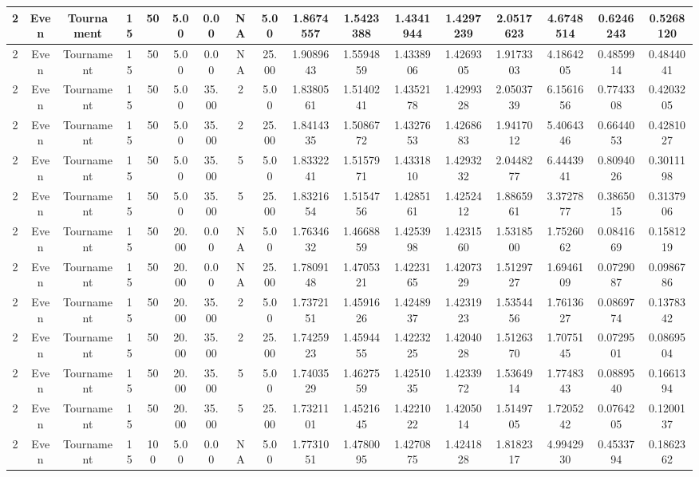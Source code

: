 \begin{longtable}{ | c | c | c | c | c | c | c | c | c | c | c | c | c | c | c | c | c | }
	\hline
	2	&	Even	&	Tournament	&	15	&	50	&	5.00	&	0.00	&	NA	&	5.00	&	1.8674557	&	1.5423388	&	1.4341944	&	1.4297239	&	2.0517623	&	4.6748514	&	0.6246243	&	0.5268120 \\
	\hline
	2	&	Even	&	Tournament	&	15	&	50	&	5.00	&	0.00	&	NA	&	25.00	&	1.9089643	&	1.5594859	&	1.4338906	&	1.4269305	&	1.9173303	&	4.1864205	&	0.4859914	&	0.4844041 \\
	\hline
	2	&	Even	&	Tournament	&	15	&	50	&	5.00	&	35.00	&	2	&	5.00	&	1.8380561	&	1.5140241	&	1.4352178	&	1.4299328	&	2.0503739	&	6.1561656	&	0.7743308	&	0.4203205 \\
	\hline
	2	&	Even	&	Tournament	&	15	&	50	&	5.00	&	35.00	&	2	&	25.00	&	1.8414335	&	1.5086772	&	1.4327653	&	1.4268683	&	1.9417012	&	5.4064346	&	0.6644053	&	0.4281027 \\
	\hline
	2	&	Even	&	Tournament	&	15	&	50	&	5.00	&	35.00	&	5	&	5.00	&	1.8332241	&	1.5157971	&	1.4331810	&	1.4293232	&	2.0448277	&	6.4443941	&	0.8094026	&	0.3011198 \\
	\hline
	2	&	Even	&	Tournament	&	15	&	50	&	5.00	&	35.00	&	5	&	25.00	&	1.8321654	&	1.5154756	&	1.4285161	&	1.4252412	&	1.8865961	&	3.3727877	&	0.3865015	&	0.3137906 \\
	\hline
	2	&	Even	&	Tournament	&	15	&	50	&	20.00	&	0.00	&	NA	&	5.00	&	1.7634632	&	1.4668859	&	1.4253998	&	1.4231560	&	1.5318500	&	1.7526062	&	0.0841669	&	0.1581219 \\
	\hline
	2	&	Even	&	Tournament	&	15	&	50	&	20.00	&	0.00	&	NA	&	25.00	&	1.7809148	&	1.4705321	&	1.4223165	&	1.4207329	&	1.5129727	&	1.6946109	&	0.0729087	&	0.0986786 \\
	\hline
	2	&	Even	&	Tournament	&	15	&	50	&	20.00	&	35.00	&	2	&	5.00	&	1.7372151	&	1.4591626	&	1.4248937	&	1.4231923	&	1.5354456	&	1.7613627	&	0.0869774	&	0.1378342 \\
	\hline
	2	&	Even	&	Tournament	&	15	&	50	&	20.00	&	35.00	&	2	&	25.00	&	1.7425923	&	1.4594455	&	1.4223225	&	1.4204028	&	1.5126370	&	1.7075145	&	0.0729501	&	0.0869504 \\
	\hline
	2	&	Even	&	Tournament	&	15	&	50	&	20.00	&	35.00	&	5	&	5.00	&	1.7403529	&	1.4627559	&	1.4251035	&	1.4233972	&	1.5364914	&	1.7748343	&	0.0889540	&	0.1661394 \\
	\hline
	2	&	Even	&	Tournament	&	15	&	50	&	20.00	&	35.00	&	5	&	25.00	&	1.7321101	&	1.4521645	&	1.4221022	&	1.4205014	&	1.5149705	&	1.7205242	&	0.0764205	&	0.1200137 \\
	\hline
	2	&	Even	&	Tournament	&	15	&	100	&	5.00	&	0.00	&	NA	&	5.00	&	1.7731051	&	1.4780095	&	1.4270875	&	1.4241828	&	1.8182317	&	4.9942930	&	0.4533794	&	0.1862362 \\

\end{longtable}
